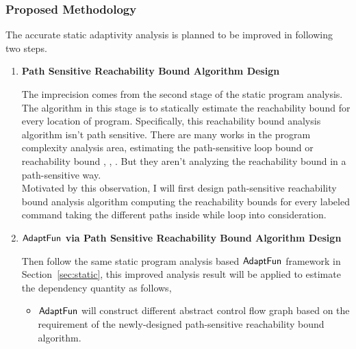 \subsubsection{Proposed Methodology}
\label{subsubsec:furthers-reachability}
The accurate static adaptivity analysis is planned to be improved in following two steps.
\begin{enumerate}
    \item \textbf{Path Sensitive Reachability Bound Algorithm Design}
    
    The imprecision comes from the second stage of the static program analysis.
    The algorithm in this stage is to statically estimate the 
    reachability bound for every location of program.
    Specifically, this reachability bound analysis algorithm isn't path sensitive. 
    There are many works in the program complexity analysis area, estimating the path-sensitive loop bound 
    or reachability bound
    \cite{GustafssonEL05, HumenbergerJK18}, 
    \cite{BrockschmidtEFFG16,AlbertAGP08,AliasDFG10,Flores-MontoyaH14}, 
    \cite{GulwaniZ10, SinnZV17,GulwaniJK09, GulwaniMC09, abs-2203-04243}. 
    But they aren't analyzing the reachability
    bound in a path-sensitive way.
    \\
    Motivated by this observation, I will first design path-sensitive reachability bound analysis algorithm computing the 
    reachability bounds for every labeled command taking the different paths inside while loop into consideration.
    \item \textbf{$\textsf{AdaptFun}$ via Path Sensitive Reachability Bound Algorithm Design}

    Then follow the same static program analysis based $\textsf{AdaptFun}$ framework in Section~\ref{sec:static},
this improved analysis result will be applied to estimate the dependency quantity as follows,
\begin{itemize}
    \item $\textsf{AdaptFun}$ will construct different abstract control flow graph based on the requirement of the newly-designed
    path-sensitive reachability bound algorithm.


\end{itemize}
\end{enumerate}
